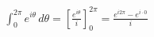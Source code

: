 \documentclass[preview]{standalone}
\begin{document}
\begin{align*}
\int_0^{2\pi} e^{i\theta} \, d\theta = \left[\frac{e^{i\theta}}{i}\right]_0^{2\pi} = \frac{e^{i2\pi} - e^{i\cdot0}}{i}
\end{align*}
\end{document}
